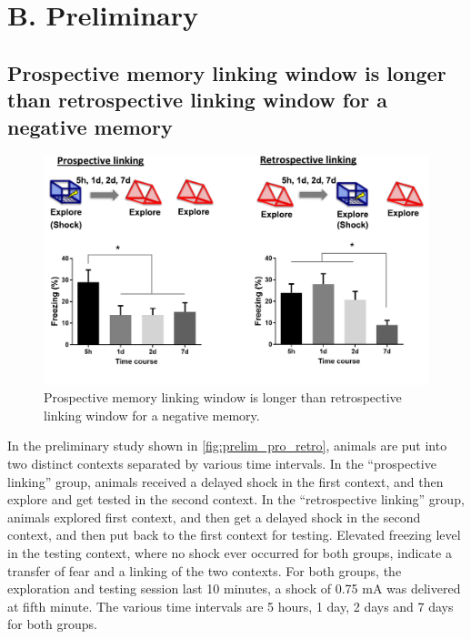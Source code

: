 \documentclass[master.tex]{subfiles}
\begin{document}
\section*{B. Preliminary}

\subsection*{Prospective memory linking window is longer than retrospective
  linking window for a negative memory}


\begin{figure}[h]
  \centering \includegraphics[scale = .4]{Figures/pro_retro_prelim.pdf}
  \caption{\footnotesize Prospective memory linking window is longer than
    retrospective linking window for a negative memory.}
  \label{fig:prelim_pro_retro}
\end{figure}

In the preliminary study shown in \autoref{fig:prelim_pro_retro}, animals are
put into two distinct contexts separated by various time intervals. In the
``prospective linking'' group, animals received a delayed shock in the first
context, and then explore and get tested in the second context. In the
``retrospective linking'' group, animals explored first context, and then get a
delayed shock in the second context, and then put back to the first context for
testing. Elevated freezing level in the testing context, where no shock ever
occurred for both groups, indicate a transfer of fear and a linking of the two
contexts. For both groups, the exploration and testing session last 10 minutes,
a shock of 0.75 mA was delivered at fifth minute. The various time intervals are
5 hours, 1 day, 2 days and 7 days for both groups.
\end{document}
